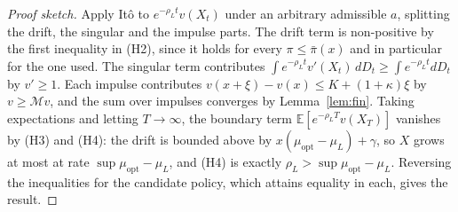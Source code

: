 \documentclass[11pt]{article}
\theoremstyle{remark}
\begin{document}
\begin{proof}[Proof sketch]
Apply It\^o to $e^{-\rho_L t}v(X_t)$ under an arbitrary admissible $a$,
splitting the drift, the singular and the impulse parts. The drift term is
non-positive by the first inequality in (H2), since it holds for every
$\pi \le \bar\pi(x)$ and in particular for the one used. The singular term
contributes $\int e^{-\rho_L t} v'(X_t)\,dD_t \ge \int e^{-\rho_L t}dD_t$
by $v' \ge 1$. Each impulse contributes
$v(x+\xi) - v(x) \le K + (1+\kappa)\xi$ by $v \ge \mathcal{M}v$, and the
sum over impulses converges by Lemma~\ref{lem:fin}. Taking expectations
and letting $T\to\infty$, the boundary term
$\mathbb{E}[e^{-\rho_L T}v(X_T)]$ vanishes by (H3) and (H4): the drift is
bounded above by $x(\mu_{\mathrm{opt}}-\mu_L)+\gamma$, so $X$ grows at
most at rate $\sup\mu_{\mathrm{opt}}-\mu_L$, and (H4) is exactly
$\rho_L > \sup\mu_{\mathrm{opt}}-\mu_L$. Reversing the inequalities for
the candidate policy, which attains equality in each, gives the result.
\end{proof}
\end{document}
